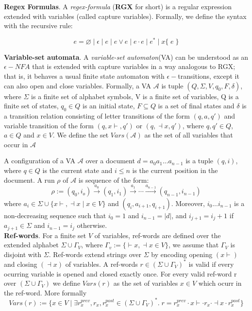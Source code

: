 \documentclass{article}
\begin{document}
\textbf{Regex Formulas}. A \textit{regex-formula} (\textbf{RGX} for short) is a regular expression extended with variables (called capture variables). Formally, we define the syntax with the recursive rule:

\[e = \varnothing \mid \epsilon \mid e \mid e \lor e \mid e \cdot e \mid e^* \mid x\{ \; e \; \}\]


\textbf{Variable-set automata}. A \textit{variable-set automaton}(VA) can be understood as an $\epsilon-NFA$ that is extended with capture variables in a way analogous to RGX; that is, it behaves a usual finite state automaton with $\epsilon-$transitions, except it can also open and close variables. Formally, a VA $\mathcal{A}$ is tuple $(Q, \Sigma, V, q_0, F, \delta )$, where $\Sigma$ is a finite set of alphabet symbols, V is a finite set of variables, Q is a finite set of states, $q_0 \in Q$ is an initial state, $F \subseteq Q$ is a set of final states and $\delta$ is a transition relation consisting of letter transitions of the form $(q, a, q')$ and variable transition of the form $(q, x\vdash, q')$ or $(q, \dashv x, q')$, where $q, q' \in Q$, $a \in Q$ and $x \in V$. We define the set $Vars(\mathcal{A})$ as the set of all variables that occur in $\mathcal{A}$

A configuration of a VA $\mathcal{A}$ over a document $d = a_0 a_1 ... a_{n-1}$ is a tuple $(q, i)$, where $q \in Q$ is the current state and $i \leq n$ is the current position in the document. A run $\rho$ of $\mathcal{A}$ is sequence of the form: \[\rho := (q_0, i_o) \xrightarrow[]{a_0}(q_1, i_1) \xrightarrow[]{a_1} \cdots \xrightarrow[]{a_{n-1}} (q_{n-1}, i_{n-1})\]where $a_i \in \Sigma \cup \{x\vdash, \dashv x \; | \; x \in V\}$ and $(q_i, a_{i+1}, q_{i+1})$. Moreover, $i_0...i_{n-1}$ is a non-decreasing sequence such that $i_0 = 1$ and $i_{n-1} = |d|$, and $i_{j+1} = i_j + 1$ if $a_{j+1} \in \Sigma$ and $i_{n-1} = i_{j}$ otherwise. \\


\textbf{Ref-words}. For a finite set $V$ of variables, ref-words are defined over the extended alphabet $\Sigma \cup \Gamma_V$, where $\Gamma_v := \{\vdash x, \dashv x \in V\}$, we assume that $\Gamma_V$ is disjoint with $\Sigma$. Ref-words extend strings over $\Sigma$ by encoding opening $(x\vdash)$ and closing $(\dashv x)$ of variables.
A ref-words $r \in (\Sigma \cup \Gamma_V)^*$ is valid if every ocurring variable is opened and closed exactly once. For every valid ref-word r over $(\Sigma \cup \Gamma_V)$ we define $Vars(r)$ as the set of variables $x \in V$ which ocurr in the ref-word. More formally \[Vars(r) := \{ x \in V \; | \; \exists r^{prev}_x, r_x, r_x^{post} \in (\Sigma \cup \Gamma_V)^*.\; r = r_x^{prev} \cdot x\vdash \cdot r_x \cdot \dashv x \cdot r_x^{post}\}\]
\end{document}
